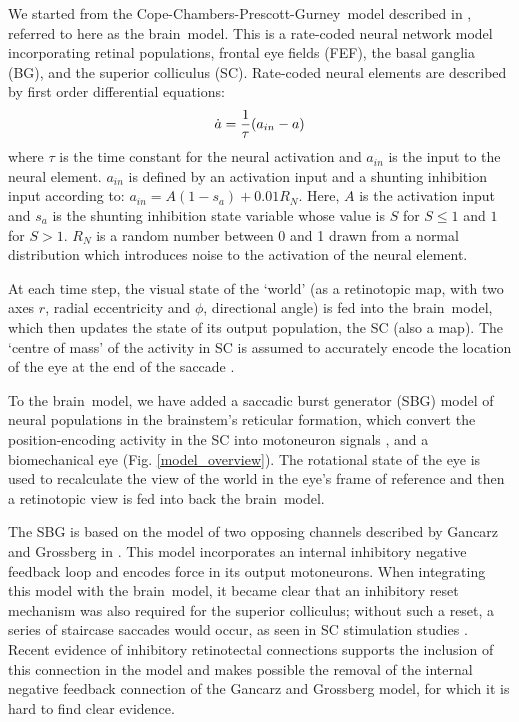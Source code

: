 \documentclass[11pt, a4paper]{article}
\newcommand{\ccg}{Cope-Chambers-Prescott-Gurney}
\newcommand{\brain}{brain}
\newcommand{\mycite}[1]{\cite{#1}}
\begin{document}
We started from the \ccg~model described
in \mycite{alex_cope_integrative_2015}, referred to here as
the \brain~model. This is a rate-coded neural network model
incorporating retinal populations, frontal eye fields (FEF), the basal
ganglia (BG), and the superior colliculus (SC). Rate-coded neural
elements are described by first order differential equations:
\[
   \dot{a} = {1 \over \tau}(a_{in}-a)
\]
where $\tau$ is the time constant for the neural activation and
$a_{in}$ is the input to the neural element. $a_{in}$ is defined by an
activation input and a shunting inhibition input according to: $a_{in}
= A(1-s_a)+0.01 R_N$. Here, $A$ is the activation input and $s_a$ is
the shunting inhibition state variable whose value is $S$ for $S\leq1$
and $1$ for $S>1$. $R_N$ is a random number between 0 and 1 drawn from
a normal distribution which introduces noise to the activation of the
neural element.

At each time step, the visual state of the `world' (as a retinotopic
map, with two axes $r$, radial eccentricity and $\phi$, directional
angle) is fed into the \brain~model, which then updates the state of
its output population, the SC (also a map). The `centre of mass' of
the activity in SC is assumed to accurately encode the location of the
eye at the end of the saccade \mycite{van_gisbergen_collicular_1987}.

To the \brain~model, we have added a saccadic burst generator (SBG)
model of neural populations in the brainstem's reticular formation,
which convert the position-encoding activity in the SC into motoneuron
signals \mycite{gancarz_neural_1998}, and a biomechanical eye
(Fig. \ref{model_overview}). The rotational state of the eye is used
to recalculate the view of the world in the eye's frame of reference
and then a retinotopic view is fed into back the \brain~model.

The SBG is based on the model of two opposing channels described by
Gancarz and Grossberg in \mycite{gancarz_neural_1998}. This model
incorporates an internal inhibitory negative feedback loop and encodes
force in its output motoneurons. When integrating this model with
the \brain~model, it became clear that an inhibitory reset mechanism
was also required for the superior colliculus; without such a reset, a
series of staircase saccades would occur, as seen in SC stimulation
studies \mycite{schiller_single-unit_1972}. Recent evidence of
inhibitory retinotectal connections \mycite{wang_macaque_2010}
supports the inclusion of this connection in the model and makes
possible the removal of the internal negative feedback connection of
the Gancarz and Grossberg model, for which it is hard to find clear
evidence.
\end{document}

